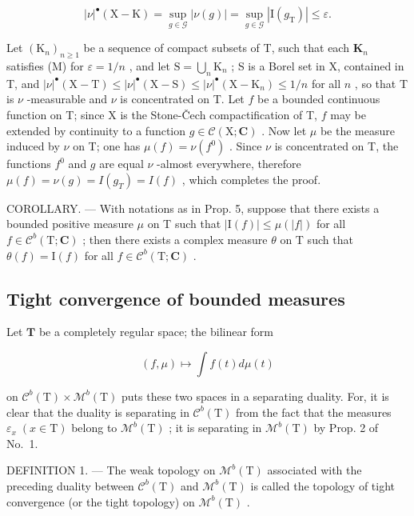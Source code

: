 \[
| \nu | ^ {\bullet} (\mathrm{X} - \mathrm{K}) = \sup _ {g \in \mathcal {G}} | \nu (g) | = \sup _ {g \in \mathcal {G}} | \mathrm{I} (g _ {\mathrm{T}}) | \leqslant \varepsilon .
\]

Let \((\mathrm{K}_n)_{n\geqslant 1}\) be a sequence of compact subsets of T, such that each \(\mathbf{K}_n\) satisfies (M) for \(\varepsilon = 1 / n\) , and let \(\mathrm{S} = \bigcup_{n}\mathrm{K}_{n}\) ; S is a Borel set in X, contained in T, and \(|\nu|^{\bullet}(\mathrm{X} - \mathrm{T})\leqslant |\nu |^{\bullet}(\mathrm{X} - \mathrm{S})\leqslant |\nu |^{\bullet}(\mathrm{X} - \mathrm{K}_n)\leqslant 1 / n\) for all \(n\) , so that T is \(\nu\) -measurable and \(\nu\) is concentrated on T. Let \(f\) be a bounded continuous function on T; since X is the Stone-Čech compactification of T, \(f\) may be extended by continuity to a function \(g\in \mathcal{C}(\mathrm{X};\mathbf{C})\) . Now let \(\mu\) be the measure induced by \(\nu\) on T; one has \(\mu(f) = \nu(f^0)\) . Since \(\nu\) is concentrated on T, the functions \(f^0\) and \(g\) are equal \(\nu\) -almost everywhere, therefore \(\mu(f) = \nu(g) = I(g_T) = I(f)\) , which completes the proof.

COROLLARY. --- With notations as in Prop. 5, suppose that there exists a bounded positive measure \(\mu\) on T such that \(|\mathrm{I}(f)| \leqslant \mu(|f|)\) for all \(f \in \mathcal{C}^b(\mathrm{T};\mathbf{C})\) ; then there exists a complex measure \(\theta\) on T such that \(\theta(f) = \mathrm{I}(f)\) for all \(f \in \mathcal{C}^b(\mathrm{T};\mathbf{C})\) .

\subsection{Tight convergence of bounded measures}

Let \(\mathbf{T}\) be a completely regular space; the bilinear form

\[
(f, \mu) \mapsto \int f (t) d \mu (t)
\]

on \(\mathcal{C}^{b}(\mathrm{T})\times\mathcal{M}^{b}(\mathrm{T})\) puts these two spaces in a separating duality. For, it is clear that the duality is separating in \(\mathcal{C}^{b}(\mathrm{T})\) from the fact that the measures \(\varepsilon_{x}\;(x\in\mathrm{T})\) belong to \(\mathcal{M}^{b}(\mathrm{T})\) ; it is separating in \(\mathcal{M}^{b}(\mathrm{T})\) by Prop. 2 of No.~1.

DEFINITION 1. --- The weak topology on \(\mathcal{M}^{b}(\mathrm{T})\) associated with the preceding duality between \(\mathcal{C}^{b}(\mathrm{T})\) and \(\mathcal{M}^{b}(\mathrm{T})\) is called the topology of tight convergence (or the tight topology) on \(\mathcal{M}^{b}(\mathrm{T})\) .

